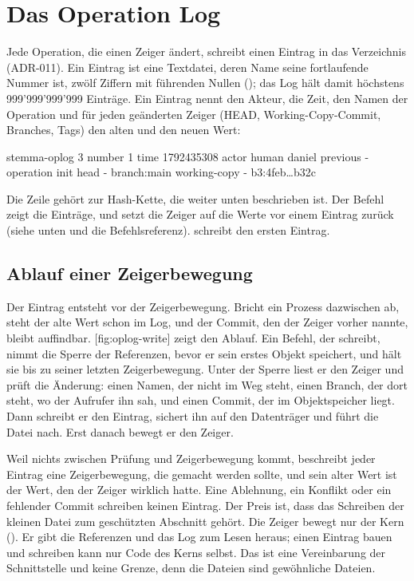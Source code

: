 {\section{Das Operation Log}

Jede Operation, die einen Zeiger ändert, schreibt einen Eintrag in das Verzeichnis
 (ADR-011).
Ein Eintrag ist eine Textdatei, deren Name seine fortlaufende Nummer ist,
zwölf Ziffern mit führenden Nullen ();
das Log hält damit höchstens 999'999'999'999 Einträge.
Ein Eintrag nennt den Akteur, die Zeit, den Namen der Operation
und für jeden geänderten Zeiger (HEAD, Working-Copy-Commit, Branches, Tags)
den alten und den neuen Wert:

\starttyping
stemma-oplog 3
number 1
time 1792435308
actor human daniel
previous -
operation init
head - branch:main
working-copy - b3:4feb…b32c
\stoptyping

Die Zeile  gehört zur Hash-Kette, die weiter unten beschrieben ist.
Der Befehl  zeigt die Einträge,
und  setzt die Zeiger auf die Werte vor einem Eintrag zurück
(siehe unten und die Befehlsreferenz).
 schreibt den ersten Eintrag.

\subsection[sec:pointer-move]{Ablauf einer Zeigerbewegung}

Der Eintrag entsteht vor der Zeigerbewegung.
Bricht ein Prozess dazwischen ab, steht der alte Wert schon im Log,
und der Commit, den der Zeiger vorher nannte, bleibt auffindbar.
[fig:oplog-write] zeigt den Ablauf.
Ein Befehl, der schreibt, nimmt die Sperre der Referenzen, bevor er sein erstes Objekt speichert,
und hält sie bis zu seiner letzten Zeigerbewegung.
Unter der Sperre liest er den Zeiger und prüft die Änderung:
einen Namen, der nicht im Weg steht,
einen Branch, der dort steht, wo der Aufrufer ihn sah,
und einen Commit, der im Objektspeicher liegt.
Dann schreibt er den Eintrag, sichert ihn auf den Datenträger
und führt die Datei  nach.
Erst danach bewegt er den Zeiger.

\startplacefigure[title={Ablauf einer Zeigerbewegung mit Absturzpunkten},
    reference=fig:oplog-write,location=here]
\stopplacefigure

Weil nichts zwischen Prüfung und Zeigerbewegung kommt,
beschreibt jeder Eintrag eine Zeigerbewegung, die gemacht werden sollte,
und sein alter Wert ist der Wert, den der Zeiger wirklich hatte.
Eine Ablehnung, ein Konflikt oder ein fehlender Commit schreiben keinen Eintrag.
Der Preis ist, dass das Schreiben der kleinen Datei zum geschützten Abschnitt gehört.
Die Zeiger bewegt nur der Kern ().
Er gibt die Referenzen und das Log zum Lesen heraus;
einen Eintrag bauen und schreiben kann nur Code des Kerns selbst.
Das ist eine Vereinbarung der Schnittstelle und keine Grenze,
denn die Dateien sind gewöhnliche Dateien.

}
